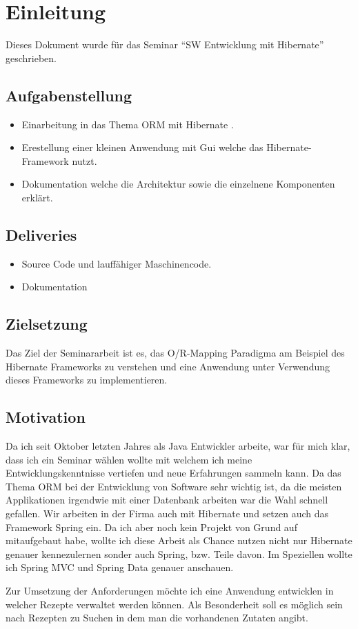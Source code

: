 \chapter{Einleitung}
\label{chap:Einleitung}
Dieses Dokument wurde für das Seminar \enquote{SW Entwicklung mit Hibernate} geschrieben.

\section{Aufgabenstellung}
\begin{itemize}
	\item Einarbeitung in das Thema ORM mit Hibernate \cite{Hibernate}.
	\item Erestellung einer kleinen Anwendung mit Gui welche das Hibernate-Framework nutzt.
	\item Dokumentation welche die Architektur sowie die einzelnene Komponenten erklärt.
\end{itemize}


\section{Deliveries}
\begin{itemize}
	\item Source Code und lauffähiger Maschinencode.
	\item Dokumentation
\end{itemize}

\section{Zielsetzung}
Das Ziel der Seminararbeit ist es, das O/R-Mapping Paradigma am Beispiel des Hibernate Frameworks zu verstehen und eine Anwendung unter Verwendung dieses Frameworks zu implementieren.

\section{Motivation}
Da ich seit Oktober letzten Jahres als Java Entwickler arbeite, war für mich klar, dass ich ein Seminar wählen wollte mit welchem ich meine Entwicklungskenntnisse vertiefen und neue Erfahrungen sammeln kann. Da das Thema ORM bei der Entwicklung von Software sehr wichtig ist, da die meisten Applikationen irgendwie mit einer Datenbank arbeiten war die Wahl schnell gefallen. Wir arbeiten in der Firma auch mit Hibernate und setzen auch das Framework Spring \cite{Spring} ein. Da ich aber noch kein Projekt von Grund auf mitaufgebaut habe, wollte ich diese Arbeit als Chance nutzen nicht nur Hibernate genauer kennezulernen sonder auch Spring, bzw. Teile davon. Im Speziellen wollte ich Spring MVC und Spring Data genauer anschauen.

Zur Umsetzung der Anforderungen möchte ich eine Anwendung entwicklen in welcher Rezepte verwaltet werden können. Als Besonderheit soll es möglich sein nach Rezepten zu Suchen in dem man die vorhandenen Zutaten angibt. 